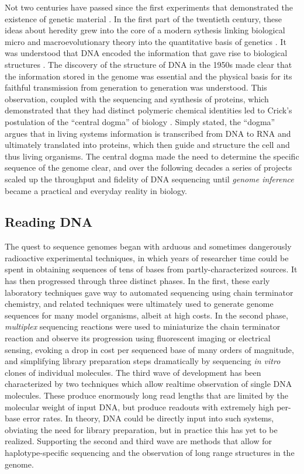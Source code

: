 Not two centuries have passed since the first experiments that demonstrated the existence of genetic material \cite{mendel1866versuche}.
In the first part of the twentieth century, these ideas about heredity grew into the core of a modern sythesis linking biological micro and macroevolutionary theory into the quantitative basis of genetics \cite{huxley1942evolution}.
It was understood that DNA encoded the information that gave rise to biological structures \cite{avery1944studies}.
The discovery of the structure of DNA in the 1950s \cite{watson1953molecular} made clear that the information stored in the genome was essential and the physical basis for its faithful transmission from generation to generation was understood.
This observation, coupled with the sequencing and synthesis of proteins, which demonstrated that they had distinct polymeric chemical identities \cite{sanger1951amino} led to Crick's postulation of the ``central dogma'' of biology \cite{crick1958protein}.
Simply stated, the ``dogma'' argues that in living systems information is transcribed from DNA to RNA and ultimately translated into proteins, which then guide and structure the cell and thus living organisms.
The central dogma made the need to determine the specific sequence of the genome clear, and over the following decades a series of projects scaled up the throughput and fidelity of DNA sequencing until \emph{genome inference} became a practical and everyday reality in biology.

\subsection{Reading DNA}

The quest to sequence genomes began with arduous and sometimes dangerously radioactive experimental techniques, in which years of researcher time could be spent in obtaining sequences of tens of bases from partly-characterized sources.
It has then progressed through three distinct phases.
In the first, these early laboratory techniques gave way to automated sequencing using chain terminator chemistry, and related techniques were ultimately used to generate genome sequences for many model organisms, albeit at high costs.
In the second phase, \emph{multiplex} sequencing reactions were used to miniaturize the chain terminator reaction and observe its progression using fluorescent imaging or electrical sensing, evoking a drop in cost per sequenced base of many orders of magnitude, and simplifying library preparation steps dramatically by sequencing \emph{in vitro} clones of individual molecules.
The third wave of development has been characterized by two techniques which allow realtime observation of single DNA molecules.
These produce enormously long read lengths that are limited by the molecular weight of input DNA, but produce readouts with extremely high per-base error rates.
In theory, DNA could be directly input into such systems, obviating the need for library preparation, but in practice this has yet to be realized.
Supporting the second and third wave are methods that allow for haplotype-specific sequencing and the observation of long range structures in the genome.


